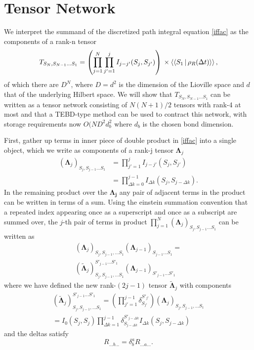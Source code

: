 \documentclass[a4paper, aps, pra,twocolumn]{revtex4-1}
\newcommand{\dbraket}[1]{\left\langle\Braket{#1}\right\rangle}
\begin{document}
\section{Tensor Network}
We interpret the summand of the discretized path integral equation \eqref{iffac} as the components of a rank-n tensor
\begin{equation} \label{inftens}
 T_{S_N, S_{N-1} \ldots S_1}=\left(\prod_{j=1}^N \prod_{j'=1}^j I_{j-j'}(S_j,S_{j'})\right)\\
\times \dbraket{S_1 |\rho_R(\Delta t)},
\end{equation}
of which there are $D^N$, where $D=d^2$ is the dimension of the Lioville space and $d$ that of the underlying Hilbert space.
We will show that $T_{S_N, S_{N-1} \ldots S_1}$ can be written as a tensor network consisting of $N(N+1)/2$ tensors with rank-4 at most and that a TEBD-type method can be used to contract this network, with storage requirements now $O(N D^2 d_b^2$ where $d_b$ is the chosen bond dimension.

First, gather up terms in inner piece of double product in \eqref{iffac} into a single object, which we write as components of a rank-j tensor $\mathbf{\Lambda}_j$
\begin{align}\label{lamdef}
 (\mathbf{\Lambda}_j)_{S_j, S_{j-1} \ldots S_{1}}&= \prod_{j'=1}^{j} I_{j-j'}(S_j,S_{j'}) \\
 &= \prod_{\Delta k=0}^{j-1} I_{\Delta k}(S_j,S_{j-\Delta k}).
\end{align}
In the remaining product over the $\mathbf{\Lambda_j}$ any pair of adjacent terms in the product can be written in terms of a sum.  Using the einstein summation convention that a repeated index appearing once as a superscript and once as a subscript are summed over, the $j$-th pair of terms in product $\prod_{j=1}^{N}(\mathbf{\Lambda}_j)_{S_j, S_{j-1} \ldots S_{1}}$ can be written as
\begin{multline}
 (\mathbf{\Lambda}_j)_{S_{j}, S_{j-1}, \ldots S_{1}} (\mathbf{\Lambda}_{j-1})_{ S_{j-1} \ldots S_{1}} = \\
  (\tilde{\mathbf{\Lambda}}_j)_{ S_j, S_{j-1}, \ldots S_{1}}^{S'_{j-1} \ldots S'_{1}} (\mathbf{\Lambda}_{j-1})_{ S'_{j-1} \ldots S'_{1}}
\end{multline}
where we have defined the new rank-$(2j-1)$ tensor $\tilde{\mathbf{\Lambda}}_j$ with components
\begin{multline}
  (\tilde{\mathbf{\Lambda}}_j)_{S_j, S_{j-1}, \ldots S_{1}}^{ S'_{j-1} \ldots S'_{1}}=\left(\prod_{j'=1}^{j-1} \delta_{S_{j'}}^{S'_{j'}}\right) (\mathbf{\Lambda}_j)_{ S_j, S_{j-1}, \ldots S_{1}}\\
  = I_0(S_{j},S_{j}) \prod_{\Delta k=1}^{j-1} \delta_{S_{j-\Delta k}}^{S'_{j-\Delta k}} I_{\Delta k}(S_{j},S_{j-\Delta k})
\end{multline}
and the deltas satisfy
\begin{equation}
R_{... b ...}= \delta^a_b R_{... a ...}.
\end{equation}
\end{document}
